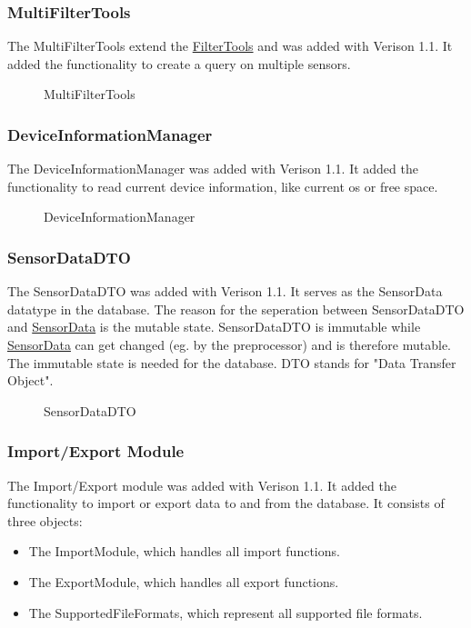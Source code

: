 \documentclass[12pt]{article}
\newcounter{fr}
\begin{document}
\subsubsection{MultiFilterTools}
\label{sec:MultiFilterTools}
The MultiFilterTools extend the \hyperref[sec:FilterTools]{FilterTools} and was added with Verison 1.1. It added the functionality to create a query on multiple sensors. 
\begin{figure}[ht]
\centering

\caption{\label{fig:bild13} MultiFilterTools}
\end{figure}
\newpage

\subsubsection{DeviceInformationManager}
\label{sec:DeviceInformationManager}
The DeviceInformationManager was added with Verison 1.1. It added the functionality to read current device information, like current os or free space.

\begin{figure}[ht]
\centering

\caption{\label{fig:bild14} DeviceInformationManager}
\end{figure}


\subsubsection{SensorDataDTO}
\label{sec:SensorDataDTO}
The SensorDataDTO was added with Verison 1.1. It serves as the SensorData datatype in the database. The reason for the seperation between SensorDataDTO and \hyperref[sec:SensorData]{SensorData} is the mutable state. SensorDataDTO is immutable while \hyperref[sec:SensorData]{SensorData} can get changed (eg. by the preprocessor) and  is therefore mutable. The immutable state is needed for the database. DTO stands for "Data Transfer Object".

\begin{figure}[ht]
\centering

\caption{\label{fig:bild15} SensorDataDTO}
\end{figure}
\newpage


\subsubsection{Import/Export Module}
\label{sec:Import/ExportModule}
The Import/Export module was added with Verison 1.1. It added the functionality to import or export data to and from the database. It consists of three objects:
\begin{itemize}
  \item The ImportModule, which handles all import functions.
  \item The ExportModule, which handles all export functions.
  \item The SupportedFileFormats, which represent all supported file formats.
\end{itemize}
\end{document}
